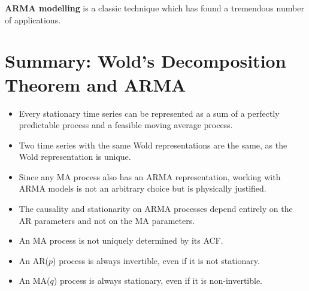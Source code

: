 \textbf{ARMA modelling} is a classic technique which has found a tremendous number of applications.

\section{Summary: Wold's Decomposition Theorem and ARMA}
\begin{itemize}
    \item Every stationary time series can be represented as a sum of a perfectly predictable process and a feasible moving average process.
    \item Two time series with the same Wold representations are the same, as the Wold representation is unique.
    \item Since any MA process also has an ARMA representation, working with ARMA models is not an arbitrary choice but is physically justified.
    \item The causality and stationarity on ARMA processes depend entirely on the AR parameters and not on the MA parameters.
    \item An MA process is not uniquely determined by its ACF.
    \item An AR(\(p\)) process is always invertible, even if it is not stationary.
    \item An MA(\(q\)) process is always stationary, even if it is non-invertible.
\end{itemize}
